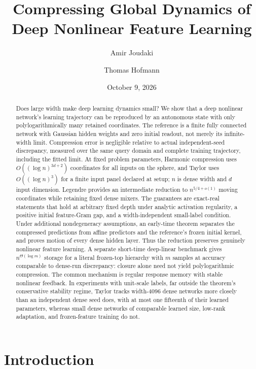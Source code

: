 \documentclass[11pt]{article}
\title{Compressing Global Dynamics of Deep Nonlinear Feature Learning}
\author{Amir Joudaki \and Thomas Hofmann}
\date{October 9, 2026}
\theoremstyle{definition}
\theoremstyle{remark}
\begin{document}
\maketitle
\begin{abstract}
Does large width make deep learning dynamics small? We show that a deep
nonlinear network's learning trajectory can be reproduced by an autonomous
state with only polylogarithmically many retained coordinates. The reference
is a finite fully connected network with Gaussian
hidden weights and zero initial readout,
not merely its infinite-width limit. Compression error is negligible
relative to actual independent-seed discrepancy, measured over the same
query domain and complete training trajectory, including the fitted limit.
At fixed problem parameters, Harmonic compression uses
$O((\log n)^{3d+2})$ coordinates for all inputs on the sphere, and Taylor
uses $O((\log n)^3)$ for a finite input panel declared at setup; $n$ is
dense width and $d$ input dimension. Legendre provides an intermediate
reduction to $n^{5/4+o(1)}$ moving coordinates while retaining fixed dense
mixers. The guarantees are exact-real statements that hold at arbitrary
fixed depth under analytic activation regularity, a positive initial
feature-Gram gap, and a width-independent small-label condition. Under
additional nondegeneracy
assumptions, an early-time theorem separates the compressed predictions
from affine predictors and the reference's frozen initial kernel, and
proves motion of every dense hidden layer. Thus the reduction preserves
genuinely nonlinear feature learning. A separate short-time deep-linear
benchmark gives $n^{\Theta(\log m)}$ storage for a literal frozen-top
hierarchy with $m$ samples at accuracy comparable to dense-run discrepancy:
closure alone need not yield polylogarithmic compression. The common
mechanism is regular response memory with stable nonlinear feedback.
In experiments with unit-scale labels, far outside the theorem's
conservative stability regime, Taylor tracks width-4096 dense networks more
closely than an independent dense seed does, with at most one fifteenth of
their learned parameters, whereas small dense networks of comparable learned
size, low-rank adaptation, and frozen-feature training do not.
\end{abstract}

\section{Introduction}
\label{cp:introduction}
\end{document}
